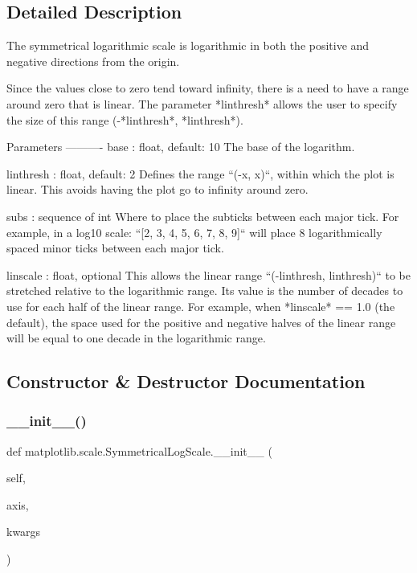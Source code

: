 \subsection{Detailed Description}
\begin{DoxyVerb}The symmetrical logarithmic scale is logarithmic in both the
positive and negative directions from the origin.

Since the values close to zero tend toward infinity, there is a
need to have a range around zero that is linear.  The parameter
*linthresh* allows the user to specify the size of this range
(-*linthresh*, *linthresh*).

Parameters
----------
base : float, default: 10
    The base of the logarithm.

linthresh : float, default: 2
    Defines the range ``(-x, x)``, within which the plot is linear.
    This avoids having the plot go to infinity around zero.

subs : sequence of int
    Where to place the subticks between each major tick.
    For example, in a log10 scale: ``[2, 3, 4, 5, 6, 7, 8, 9]`` will place
    8 logarithmically spaced minor ticks between each major tick.

linscale : float, optional
    This allows the linear range ``(-linthresh, linthresh)`` to be
    stretched relative to the logarithmic range. Its value is the number of
    decades to use for each half of the linear range. For example, when
    *linscale* == 1.0 (the default), the space used for the positive and
    negative halves of the linear range will be equal to one decade in
    the logarithmic range.
\end{DoxyVerb}
 

\subsection{Constructor \& Destructor Documentation}
\mbox{\label{classmatplotlib_1_1scale_1_1SymmetricalLogScale_ae6113677e06d8b69276f1ca89d837b42}} 
\subsubsection{\texorpdfstring{\+\_\+\+\_\+init\+\_\+\+\_\+()}{\_\_init\_\_()}}
{\footnotesize\ttfamily def matplotlib.\+scale.\+Symmetrical\+Log\+Scale.\+\_\+\+\_\+init\+\_\+\+\_\+ (\begin{DoxyParamCaption}\item[{}]{self,  }\item[{}]{axis,  }\item[{}]{kwargs }\end{DoxyParamCaption})}



